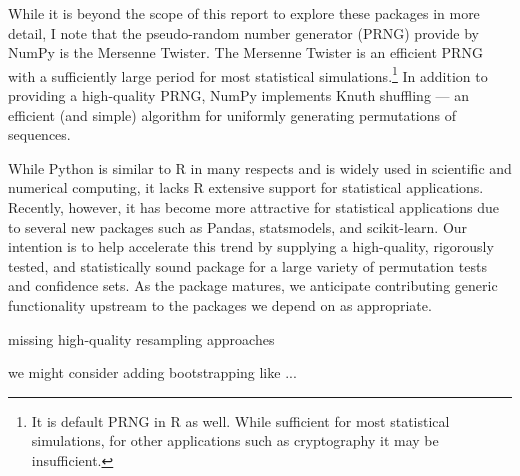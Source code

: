 While it is beyond the scope of this report to explore these packages in more
detail, I note that the pseudo-random number generator (PRNG) provide by NumPy
is the Mersenne Twister.  The Mersenne Twister is an efficient PRNG with a
sufficiently large period for most statistical simulations.\footnote{It is
default PRNG in R as well.  While sufficient for most statistical simulations,
for other applications such as cryptography it may be insufficient.}  In
addition to providing a high-quality PRNG, NumPy implements Knuth shuffling ---
an efficient (and simple) algorithm for uniformly generating permutations of
sequences.

While Python is similar to R in many respects and is widely used in scientific
and numerical computing, it lacks R extensive support for statistical
applications.  Recently, however, it has become more attractive for statistical
applications due to several new packages such as Pandas, statsmodels, and
scikit-learn.  Our intention is to help accelerate this trend by supplying a
high-quality, rigorously tested, and statistically sound package for a large
variety of permutation tests and confidence sets. As the package matures, we
anticipate contributing generic functionality upstream to the packages we
depend on as appropriate.

missing high-quality resampling approaches

we might consider adding bootstrapping like ...
